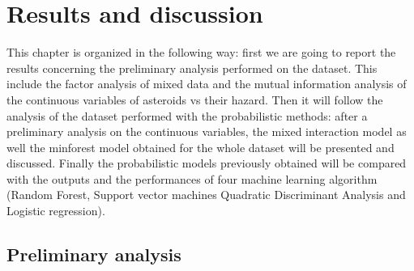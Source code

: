 \documentclass[12pt,%
               a4paper,%
               oneside,openany,%
               titlepage,%
               headinclude,footinclude,%
               BCOR5mm,%
               cleardoublepage=empty,%
               tablecaptionabove,%
               floatperchapter,
               ]{scrreprt}                 %
\begin{document}
\chapter{Results and discussion}

This chapter is organized in the following way: first we are going to report the results concerning the preliminary analysis performed on the dataset. This include the factor analysis of mixed data and the mutual information analysis of the continuous variables of asteroids vs their hazard. Then it will follow the analysis of the dataset performed with the probabilistic methods: after a preliminary analysis on the continuous variables, the mixed interaction model as well the minforest model obtained for the whole dataset will be presented and discussed. Finally the probabilistic models previously obtained will be compared with the outputs and the performances of four machine learning algorithm (Random Forest, Support vector machines Quadratic Discriminant Analysis and Logistic regression).

\section{Preliminary analysis}
\end{document}
